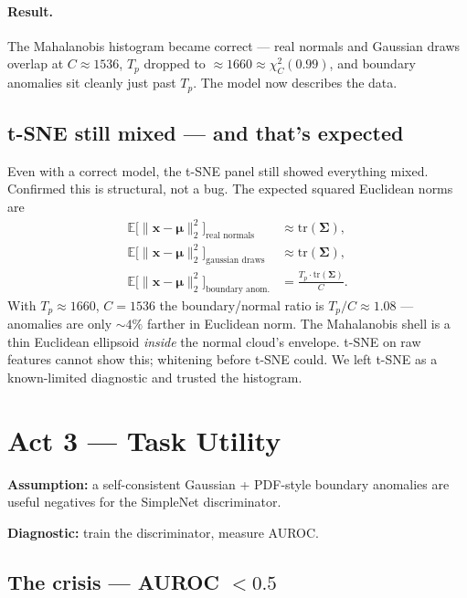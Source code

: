 \documentclass[11pt]{article}
\newcommand{\bmu}{\boldsymbol{\mu}}
\newcommand{\bSigma}{\boldsymbol{\Sigma}}
\begin{document}
\paragraph{Result.}
The Mahalanobis histogram became correct --- real normals and Gaussian draws
overlap at $C \approx 1536$, $T_p$ dropped to $\approx 1660 \approx
\chi^2_C(0.99)$, and boundary anomalies sit cleanly just past $T_p$. The model now
describes the data.

\subsection{t-SNE still mixed --- and that's expected}

Even with a correct model, the t-SNE panel still showed everything mixed.
Confirmed this is structural, not a bug. The expected squared Euclidean norms are
\begin{align}
  \mathbb{E}\bigl[\lVert \mathbf{x} - \bmu \rVert_2^2\bigr]_{\text{real normals}}
    &\approx \mathrm{tr}(\bSigma), \\
  \mathbb{E}\bigl[\lVert \mathbf{x} - \bmu \rVert_2^2\bigr]_{\text{gaussian draws}}
    &\approx \mathrm{tr}(\bSigma), \\
  \mathbb{E}\bigl[\lVert \mathbf{x} - \bmu \rVert_2^2\bigr]_{\text{boundary anom.}}
    &= \frac{T_p \cdot \mathrm{tr}(\bSigma)}{C}.
\end{align}
With $T_p \approx 1660$, $C = 1536$ the boundary/normal ratio is
$T_p / C \approx \mathbf{1.08}$ --- anomalies are only ${\sim}4\%$ farther in
Euclidean norm. The Mahalanobis shell is a thin Euclidean ellipsoid \emph{inside}
the normal cloud's envelope. t-SNE on raw features cannot show this; whitening
before t-SNE could. We left t-SNE as a known-limited diagnostic and trusted the
histogram.

\section{Act 3 --- Task Utility}

\textbf{Assumption:} a self-consistent Gaussian + PDF-style boundary anomalies
are useful negatives for the SimpleNet discriminator.

\medskip
\noindent
\textbf{Diagnostic:} train the discriminator, measure AUROC.

\subsection{The crisis --- AUROC $< 0.5$}
\end{document}
